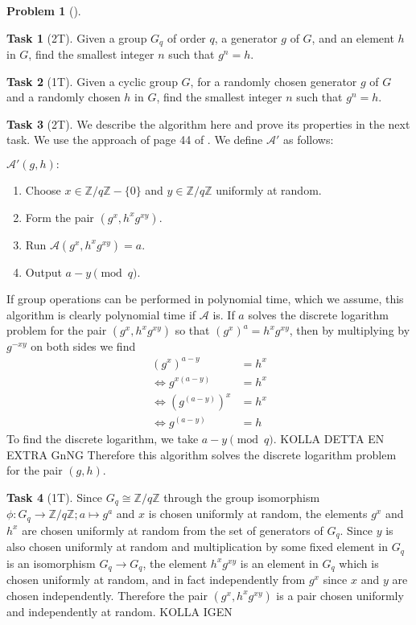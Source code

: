 \documentclass[11pt,twoside]{article}
\theoremstyle{definition}
\newtheorem{amsproblem}{Problem}
\newtheorem{amssubproblem}{Task}[amsproblem]
\newenvironment{problem}[1][]{%
  \begin{amsproblem}[#1]
  }{%
  \end{amsproblem}
}
\newenvironment{subproblem}[1][]{%
  \begin{amssubproblem}[#1]
  }{%
  \end{amssubproblem}
}
\newcommand{\TP}[1]{#1T}
\newcommand{\Z}{\mathbb{Z}}
\begin{document}
\begin{problem}
  \begin{subproblem}[\TP{2}]
    Given a group $G_q$ of order $q$, a generator $g$ of $G$, and an element $h$ in $G$, find the smallest integer $n$ such that $g^n = h$.
  \end{subproblem}
  \begin{subproblem}[\TP{1}]
        Given a cyclic group $G$, for a randomly chosen generator $g$ of $G$ and a randomly chosen $h$ in $G$, find the smallest integer $n$ such that $g^n = h$.
  \end{subproblem}
  \begin{subproblem}[\TP{2}]
    We describe the algorithm here and prove its properties in the next task. We use the approach of page 44 of \cite{galbraithMathematicsPublicKey2018}. We define $\mathcal{A}'$ as follows:

    $\mathcal{A}'(g, h):$
    \begin{enumerate}
      \item Choose $x \in \Z/q\Z - \{ 0 \}$ and $y \in \Z/q\Z$ uniformly at random.
      \item Form the pair $(g^x, h^xg^{xy})$.
      \item Run $\mathcal{A}(g^x, h^xg^{xy}) = a$.
      \item Output $a - y \pmod{q}$.
    \end{enumerate}
    If group operations can be performed in polynomial time, which we assume, this algorithm is clearly polynomial time if $\mathcal{A}$ is. If $a$ solves the discrete logarithm problem for the pair $(g^x, h^xg^{xy})$ so that $(g^x)^a = h^xg^{xy}$, then by multiplying by $g^{-xy}$ on both sides we find
    \[
    \begin{aligned}
      (g^x)^{a-y} &= h^x \\
      \iff g^{x(a-y)} &= h^x \\
      \iff \left(g^{(a-y)}\right)^x &= h^x \\
      \iff g^{(a-y)} &= h
    \end{aligned}
    \]
    To find the discrete logarithm, we take $a-y \pmod{q}$. KOLLA DETTA EN EXTRA GnNG Therefore this algorithm solves the discrete logarithm problem for the pair $(g, h)$.

  \end{subproblem}
  \begin{subproblem}[\TP{1}]
    Since $G_q \cong \Z/q\Z$ through the group isomorphism $\phi: G_q \to \Z/q\Z; a \mapsto g^a$ and $x$ is chosen uniformly at random, the elements $g^x$ and $h^x$ are chosen uniformly at random from the set of generators of $G_q$. Since $y$ is also chosen uniformly at random and multiplication by some fixed element in $G_q$ is an isomorphism $G_q \to G_q$, the element $h^xg^{xy}$ is an element in $G_q$ which is chosen uniformly at random, and in fact independently from $g^x$ since $x$ and $y$ are chosen independently. Therefore the pair $(g^x, h^xg^{xy})$ is a pair chosen uniformly and independently at random. KOLLA IGEN


\end{subproblem}
\end{problem}
\end{document}
